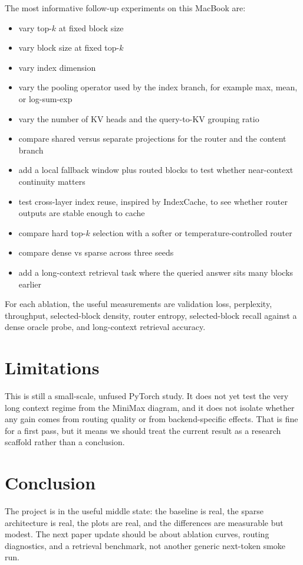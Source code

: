 \documentclass[11pt]{article}
\begin{document}
The most informative follow-up experiments on this MacBook are:
\begin{itemize}[leftmargin=1.25em]
  \item vary top-$k$ at fixed block size
  \item vary block size at fixed top-$k$
  \item vary index dimension
  \item vary the pooling operator used by the index branch, for example max, mean, or log-sum-exp
  \item vary the number of KV heads and the query-to-KV grouping ratio
  \item compare shared versus separate projections for the router and the content branch
  \item add a local fallback window plus routed blocks to test whether near-context continuity matters
  \item test cross-layer index reuse, inspired by IndexCache, to see whether router outputs are stable enough to cache
  \item compare hard top-$k$ selection with a softer or temperature-controlled router
  \item compare dense vs sparse across three seeds
  \item add a long-context retrieval task where the queried answer sits many blocks earlier
\end{itemize}

For each ablation, the useful measurements are validation loss, perplexity, throughput, selected-block density, router entropy, selected-block recall against a dense oracle probe, and long-context retrieval accuracy.

\section{Limitations}
This is still a small-scale, unfused PyTorch study.
It does not yet test the very long context regime from the MiniMax diagram, and it does not isolate whether any gain comes from routing quality or from backend-specific effects.
That is fine for a first pass, but it means we should treat the current result as a research scaffold rather than a conclusion.

\section{Conclusion}
The project is in the useful middle state: the baseline is real, the sparse architecture is real, the plots are real, and the differences are measurable but modest.
The next paper update should be about ablation curves, routing diagnostics, and a retrieval benchmark, not another generic next-token smoke run.
\end{document}
